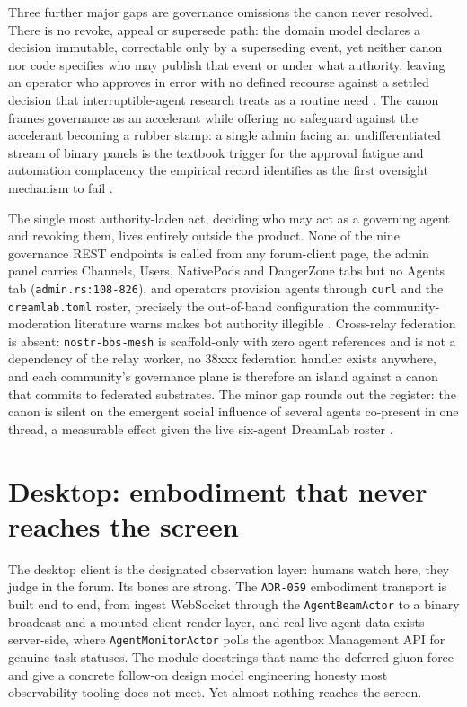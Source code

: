 Three further major gaps are governance omissions the canon never resolved. There is no revoke, appeal or supersede path: the domain model declares a decision immutable, correctable only by a superseding event, yet neither canon nor code specifies who may publish that event or under what authority, leaving an operator who approves in error with no defined recourse against a settled decision that interruptible-agent research treats as a routine need \parencite{Interruptible2026}. The canon frames governance as an accelerant while offering no safeguard against the accelerant becoming a rubber stamp: a single admin facing an undifferentiated stream of binary panels is the textbook trigger for the approval fatigue and automation complacency the empirical record identifies as the first oversight mechanism to fail \parencite{AutomationBias2012}.

The single most authority-laden act, deciding who may act as a governing agent and revoking them, lives entirely outside the product. None of the nine governance REST endpoints is called from any forum-client page, the admin panel carries Channels, Users, NativePods and DangerZone tabs but no Agents tab (\texttt{admin.rs:108-826}), and operators provision agents through \texttt{curl} and the \texttt{dreamlab.toml} roster, precisely the out-of-band configuration the community-moderation literature warns makes bot authority illegible \parencite{Kuo2026Botender}. Cross-relay federation is absent: \texttt{nostr-bbs-mesh} is scaffold-only with zero agent references and is not a dependency of the relay worker, no 38xxx federation handler exists anywhere, and each community's governance plane is therefore an island against a canon that commits to federated substrates. The minor gap rounds out the register: the canon is silent on the emergent social influence of several agents co-present in one thread, a measurable effect given the live six-agent DreamLab roster \parencite{Song2025SocialGroups}.

\section{Desktop: embodiment that never reaches the screen}

The desktop client is the designated observation layer: humans watch here, they judge in the forum. Its bones are strong. The \texttt{ADR-059} embodiment transport is built end to end, from ingest WebSocket through the \texttt{AgentBeamActor} to a binary broadcast and a mounted client render layer, and real live agent data exists server-side, where \texttt{AgentMonitorActor} polls the agentbox Management API for genuine task statuses. The module docstrings that name the deferred gluon force and give a concrete follow-on design model engineering honesty most observability tooling does not meet. Yet almost nothing reaches the screen.

